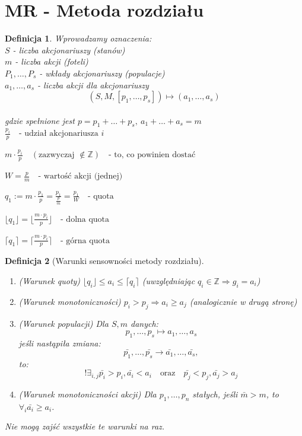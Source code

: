 \documentclass[12pt,a4paper]{article}
\theoremstyle{break}
\newtheorem{definition}{Definicja}[section]
\begin{document}
	\section{MR - Metoda rozdziału}
	\begin{definition}
		Wprowadzamy oznaczenia:\\
		$S$ - liczba akcjonariuszy (stanów)\\
		$m$ - liczba akcji (foteli)\\
		$P_1,\dots,P_s$ - wkłady akcjonariuszy (populacje)\\
		$a_1,\dots,a_s$ - liczba akcji dla akcjonariuszy\\
		
		$$(S,M,[p_1,\dots,p_s]) \longmapsto (a_1,\dots,a_s)$$\\
		gdzie spełnione jest $p=p_1+\dots+p_s,\: a_1+\dots+a_s=m$\\
		
		
		$\frac{p_i}{p} \quad \text{- udział akcjonariusza } i$
		
		
		$m\cdot\frac{p_i}{p} \quad (\text{zazwyczaj } \notin \mathbb{Z}) \quad \text{- to, co powinien dostać}$
		
		
		$W=\frac{p}{m} \quad \text{- wartość akcji (jednej)}$
		
		
		$q_1:= m\cdot \frac{p_1}{p} = \frac{p_1}{\frac{p}{m}} = \frac{p_1}{W} \quad \text{- quota}$
		
		
		$\lfloor q_1 \rfloor=\lfloor \frac{m\cdot p_i}{p} \rfloor \quad \text{- dolna quota}$
		
		
		$\lceil q_1 \rceil=\lceil \frac{m\cdot p_i}{p} \rceil \quad \text{- górna quota}$
		
	\end{definition}
	
	\begin{definition}[Warunki sensowności metody rozdziału]
		\begin{enumerate}[1.]
			\item (Warunek quoty) $\lfloor q_i \rfloor \leq a_i \leq \lceil q_i \rceil$ (uwzględniając $q_i \in \mathbb{Z} \Rightarrow g_i = a_i$)
			\item (Warunek monotoniczności) $p_i > p_j \Rightarrow a_i \geq a_j$ (analogicznie w drugą stronę)
			\item (Warunek populacji) Dla $S, m$ danych:
			\[
			p_1, \dots, p_s \longmapsto a_1, \dots, a_s
			\]
			jeśli nastąpiła zmiana:
			\[
			\bar{p_1}, \dots, \bar{p_s} \longrightarrow \bar{a_1}, \dots, \bar{a_s},
			\]
			to:
			\[
			!\exists_{i,j} \bar{p_i}>p_i, \bar{a_i}<a_i \quad \text{oraz} \quad \bar{p_j}<p_j, \bar{a_j}>a_j
			\]
			\item (Warunek monotoniczności akcji) Dla $p_1,\dots,p_n$ stałych, jeśli $\bar{m}>m$, to $\forall_i \bar{a_i} \geq a_i$.
		\end{enumerate}
		Nie mogą zajść wszystkie te warunki na raz.
	\end{definition}
	
\end{document}
